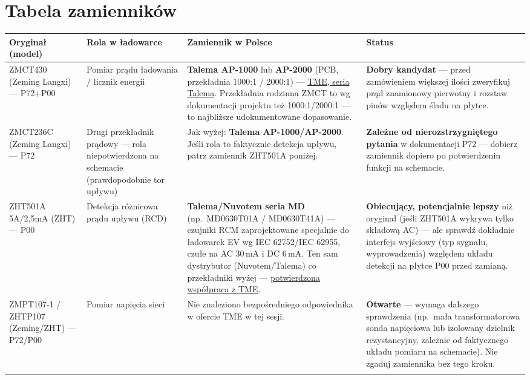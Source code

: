 \documentclass[11pt]{article}
\newcommand{\key}[1]{\textbf{\color{navy}#1}}
\newcommand{\ok}[1]{\textbf{\color{good}#1}}
\newcommand{\watch}[1]{\textbf{\color{watch}#1}}
\begin{document}
\section{Tabela zamienników}
\footnotesize
\begin{xltabular}{\linewidth}{@{}p{2.6cm} p{2.5cm} Y p{2.6cm}@{}}
\toprule
\textbf{Oryginał (model)} & \textbf{Rola w ładowarce} & \textbf{Zamiennik w Polsce} & \textbf{Status} \\
\midrule
\endhead

ZMCT430 \newline \footnotesize (Zeming Langxi) — P72+P00 &
Pomiar prądu ładowania / licznik energii &
\key{Talema AP-1000} lub \key{AP-2000} (PCB, przekładnia 1000:1 / 2000:1) — \href{https://www.tme.com/us/en-us/katalog/current-transformers_112516/p,talema_346/}{TME, seria Talema}. Przekładnia rodzinna ZMCT to wg dokumentacji projektu też 1000:1/2000:1 — to najbliższe udokumentowane dopasowanie. &
\ok{Dobry kandydat} — przed zamówieniem większej ilości zweryfikuj prąd znamionowy pierwotny i rozstaw pinów względem śladu na płytce. \\
\addlinespace

ZMCT236C \newline \footnotesize (Zeming Langxi) — P72 &
Drugi przekładnik prądowy — rola niepotwierdzona na schemacie (prawdopodobnie tor upływu) &
Jak wyżej: \key{Talema AP-1000/AP-2000}. Jeśli rola to faktycznie detekcja upływu, patrz zamiennik ZHT501A poniżej. &
\watch{Zależne od nierozstrzygniętego pytania} w dokumentacji P72 — dobierz zamiennik dopiero po potwierdzeniu funkcji na schemacie. \\
\addlinespace

ZHT501A 5A/2,5mA \newline \footnotesize (ZHT) — P00 &
Detekcja różnicowa prądu upływu (RCD) &
\key{Talema/Nuvotem seria MD} (np.\ MD0630T01A / MD0630T41A) — czujniki RCM zaprojektowane specjalnie do ładowarek EV wg IEC 62752/IEC 62955, czułe na AC 30\,mA i DC 6\,mA. Ten sam dystrybutor (Nuvotem/Talema) co przekładniki wyżej — \href{https://www.nuvotem.com/en/products/part_number_cross_reference_tme.shtml}{potwierdzona współpraca z TME}. &
\ok{Obiecujący, potencjalnie lepszy} niż oryginał (jeśli ZHT501A wykrywa tylko składową AC) — ale sprawdź dokładnie interfejs wyjściowy (typ sygnału, wyprowadzenia) względem układu detekcji na płytce P00 przed zamianą. \\
\addlinespace

ZMPT107-1 / ZHTP107 \newline \footnotesize (Zeming/ZHT) — P72/P00 &
Pomiar napięcia sieci &
Nie znaleziono bezpośredniego odpowiednika w ofercie TME w tej sesji. &
\watch{Otwarte} — wymaga dalszego sprawdzenia (np.\ mała transformatorowa sonda napięciowa lub izolowany dzielnik rezystancyjny, zależnie od faktycznego układu pomiaru na schemacie). Nie zgaduj zamiennika bez tego kroku. \\
\addlinespace


\end{xltabular}
\end{document}
